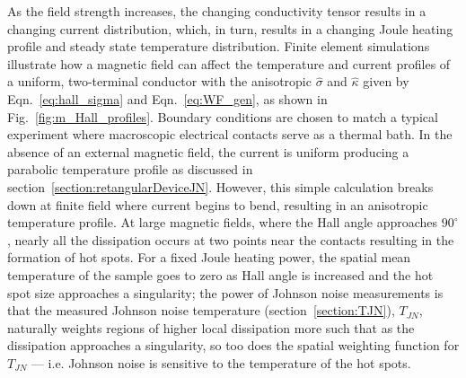 As the field strength increases, the changing conductivity tensor results in a changing current distribution, which, in turn, results in a changing Joule heating profile and steady state temperature distribution. Finite element simulations~\cite{noauthor_comsol_2017} illustrate how a magnetic field can affect the temperature and current profiles of a uniform, two-terminal conductor with the anisotropic $\hat\sigma$ and $\hat\kappa$ given by Eqn.~\ref{eq:hall_sigma} and Eqn.~\ref{eq:WF_gen}, as shown in Fig.~\ref{fig:m_Hall_profiles}. Boundary conditions are chosen to match a typical experiment where macroscopic electrical contacts serve as a thermal bath. In the absence of an external magnetic field, the current is uniform producing a parabolic temperature profile as discussed in section~\ref{section:retangularDeviceJN}. However, this simple calculation breaks down at finite field where current begins to bend, resulting in an anisotropic temperature profile. At large magnetic fields, where the Hall angle approaches $90^\circ$, nearly all the dissipation occurs at two points near the contacts resulting in the formation of hot spots. For a fixed Joule heating power, the spatial mean temperature of the sample goes to zero as Hall angle is increased and the hot spot size approaches a singularity; the power of Johnson noise measurements is that the measured Johnson noise temperature (section~\ref{section:TJN}), $T_{JN}$, naturally weights regions of higher local dissipation more such that as the dissipation approaches a singularity, so too does the spatial weighting function for $T_{JN}$ --- i.e. Johnson noise is sensitive to the temperature of the hot spots.

